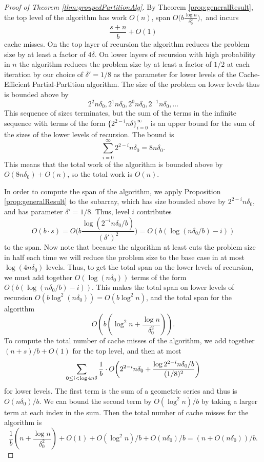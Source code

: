 \documentclass[twocolumn, twoside, 11pt]{article}
\DeclarePairedDelimiter{\paren}{(}{)}
\begin{document}
\begin{proof}[Proof of Theorem \ref{thm:groupedPartitionAlg}]
	By Theorem \ref{prop:generalResult}, the top level of the algorithm has work $O(n)$, span $O\Big(b\frac{\log n}{\delta_0^2}\Big),$
	and incurs $$\frac{s+n}{b} + O(1)$$ cache misses.  
	On the top layer of recursion the algorithm reduces the problem size by at least a factor of $4\delta$. 
	On lower layers of recursion with high probability in $n$ the algorithm reduces the problem size by at least a factor of $1/2$ at each iteration by our choice of $\delta'=1/8$ as the parameter for lower levels of the Cache-Efficient Partial-Partition algorithm.
	The size of the problem on lower levels thus is bounded above by
	$$2^2n\delta_0, 2^1n\delta_0,2^0n\delta_0, 2^{-1}n\delta_0, \ldots$$
	This sequence of sizes terminates, but the sum of the terms in the infinite sequence with terms of the form $\{2^{2-i}n\delta\}_{i=0}^{\infty}$ is an upper bound for the sum of the sizes of the lower levels of recursion. 
	 The bound is
	 $$\sum_{i=0}^{\infty}2^{2-i}n\delta_0 = 8n\delta_0.$$
	This means that the total work of the algorithm is bounded above by $O(8n\delta_0) + O(n)$, so the total work is $O(n)$.
	
	In order to compute the span of the algorithm, we apply Proposition \ref{prop:generalResult} to the subarray, which has size bounded above by $2^{2-i}n\delta_0$, and has parameter $\delta'=1/8$. 
	Thus, level $i$ contributes
	$$O(b\cdot s)=O\Big(b\frac{\log(2^{-i}n\delta_0/b)}{(\delta')^2}\Big)=O(b(\log(n\delta_0/b)-i))$$ to the span.
	Now note that because the algorithm at least cuts the problem size in half each time we will reduce the problem size to the base case in at most $\log (4n\delta_0)$ levels.
	Thus, to get the total span on the lower levels of recursion, we must add together $O(\log(n\delta_0))$ terms of the form $O(b(\log (n\delta_0/b) - i))$.
	This makes the total span on lower levels of recursion $O(b\log^2 (n\delta_0))=O(b\log^2 n)$, and the total span for the algorithm 
	$$O\left(b\left(\log^2 n + \frac{\log n}{\delta_0^2}\right)\right).$$
	To compute the total number of cache misses of the algorithm, we add together $(n+s)/b+O(1)$ for the top level, and then at most
	$$\sum_{0 \leq i<\log 4n\delta}\frac{1}{b}\cdot O\paren*{2^{2-i}n\delta_0 + \frac{\log 2^{2-i}n\delta_0/b}{(1/8)^2}}$$
	for lower levels.
	The first term is the sum of a geometric series and thus is $O(n\delta_0)/b$. 
	We can bound the second term by $O(\log^2 n)/b$ by taking a larger term at each index in the sum. 
	Then the total number of cache misses for the algorithm is 
	$$\frac{1}{b}\left(n+\frac{\log n}{\delta_0^2 }\right) + O(1) + O(\log^2 n) / b + O(n\delta_0) / b = (n+O(n\delta_0))/b.$$
\end{proof}
\end{document}
